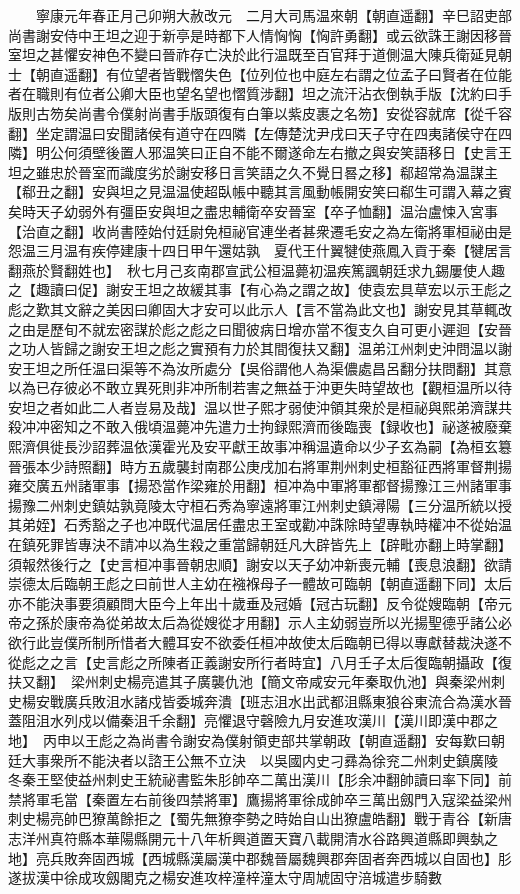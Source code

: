 　　寧康元年春正月己卯朔大赦改元　二月大司馬温來朝【朝直遥翻】辛巳詔吏部尚書謝安侍中王坦之迎于新亭是時都下人情恟恟【恟許勇翻】或云欲誅王謝因移晉室坦之甚懼安神色不變曰晉祚存亡決於此行温既至百官拜于道側温大陳兵衛延見朝士【朝直遥翻】有位望者皆戰慴失色【位列位也中庭左右謂之位孟子曰賢者在位能者在職則有位者公卿大臣也望名望也慴質涉翻】坦之流汗沾衣倒執手版【沈約曰手版則古笏矣尚書令僕射尚書手版頭復有白筆以紫皮裹之名笏】安從容就席【從千容翻】坐定謂温曰安聞諸侯有道守在四隣【左傳楚沈尹戌曰天子守在四夷諸侯守在四隣】明公何須壁後置人邪温笑曰正自不能不爾遂命左右撤之與安笑語移日【史言王坦之雖忠於晉室而識度劣於謝安移日言笑語之久不覺日晷之移】郗超常為温謀主【郗丑之翻】安與坦之見温温使超臥帳中聽其言風動帳開安笑曰郗生可謂入幕之賓矣時天子幼弱外有彊臣安與坦之盡忠輔衛卒安晉室【卒子恤翻】温治盧悚入宮事【治直之翻】收尚書陸始付廷尉免桓祕官連坐者甚衆遷毛安之為左衛將軍桓祕由是怨温三月温有疾停建康十四日甲午還姑孰　夏代王什翼犍使燕鳳入貢于秦【犍居言翻燕於賢翻姓也】　秋七月己亥南郡宣武公桓温薨初温疾篤諷朝廷求九錫屢使人趣之【趣讀曰促】謝安王坦之故緩其事【有心為之謂之故】使袁宏具草宏以示王彪之彪之歎其文辭之美因曰卿固大才安可以此示人【言不當為此文也】謝安見其草輒改之由是歷旬不就宏密謀於彪之彪之曰聞彼病日增亦當不復支久自可更小遲迴【安晉之功人皆歸之謝安王坦之彪之實預有力於其間復扶又翻】温弟江州刺史沖問温以謝安王坦之所任温曰渠等不為汝所處分【吳俗謂他人為渠儂處昌呂翻分扶問翻】其意以為已存彼必不敢立異死則非冲所制若害之無益于沖更失時望故也【觀桓温所以待安坦之者如此二人者豈易及哉】温以世子熙才弱使沖領其衆於是桓祕與熙弟濟謀共殺冲冲密知之不敢入俄頃温薨冲先遣力士拘録熙濟而後臨喪【録收也】祕遂被廢棄熙濟俱徙長沙詔葬温依漢霍光及安平獻王故事冲稱温遺命以少子玄為嗣【為桓玄簒晉張本少詩照翻】時方五歲襲封南郡公庚戌加右將軍荆州刺史桓豁征西將軍督荆揚雍交廣五州諸軍事【揚恐當作梁雍於用翻】桓冲為中軍將軍都督揚豫江三州諸軍事揚豫二州刺史鎮姑孰竟陵太守桓石秀為寧遠將軍江州刺史鎮潯陽【三分温所統以授其弟姪】石秀豁之子也冲既代温居任盡忠王室或勸冲誅除時望專執時權冲不從始温在鎮死罪皆專決不請冲以為生殺之重當歸朝廷凡大辟皆先上【辟毗亦翻上時掌翻】須報然後行之【史言桓冲事晉朝忠順】謝安以天子幼冲新喪元輔【喪息浪翻】欲請崇德太后臨朝王彪之曰前世人主幼在襁褓母子一體故可臨朝【朝直遥翻下同】太后亦不能決事要須顧問大臣今上年出十歲垂及冠婚【冠古玩翻】反令從嫂臨朝【帝元帝之孫於康帝為從弟故太后為從嫂從才用翻】示人主幼弱豈所以光揚聖德乎諸公必欲行此豈僕所制所惜者大體耳安不欲委任桓冲故使太后臨朝已得以專獻替裁決遂不從彪之之言【史言彪之所陳者正義謝安所行者時宜】八月壬子太后復臨朝攝政【復扶又翻】　梁州刺史楊亮遣其子廣襲仇池【簡文帝咸安元年秦取仇池】與秦梁州刺史楊安戰廣兵敗沮水諸戍皆委城奔潰【班志沮水出武都沮縣東狼谷東流合為漢水晉蓋阻沮水列戍以備秦沮千余翻】亮懼退守磬險九月安進攻漢川【漢川即漢中郡之地】　丙申以王彪之為尚書令謝安為僕射領吏部共掌朝政【朝直遥翻】安每歎曰朝廷大事衆所不能決者以諮王公無不立決　以吳國内史刁彞為徐兖二州刺史鎮廣陵　冬秦王堅使益州刺史王統祕書監朱肜帥卒二萬出漢川【肜余冲翻帥讀曰率下同】前禁將軍毛當【秦置左右前後四禁將軍】鷹揚將軍徐成帥卒三萬出劔門入寇梁益梁州刺史楊亮帥巴獠萬餘拒之【蜀先無獠李勢之時始自山出獠盧皓翻】戰于青谷【新唐志洋州真符縣本華陽縣開元十八年析興道置天寶八載開清水谷路興道縣即興埶之地】亮兵敗奔固西城【西城縣漢屬漢中郡魏晉屬魏興郡奔固者奔西城以自固也】肜遂拔漢中徐成攻劔閣克之楊安進攻梓潼梓潼太守周虓固守涪城遣步騎數